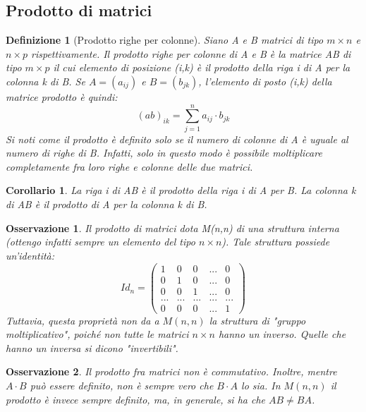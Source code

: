 \documentclass[12pt]{article}
\newenvironment{para}{\begin{adjustwidth}{13mm}{}}{\end{adjustwidth}}
\newtheorem{Definizione}{Definizione}[subsection]
\newtheorem{Corollario}{Corollario}[subsection]
\newtheorem{Osservazione}{Osservazione}[subsection]
\begin{document}
\begin{para}
\subsection{Prodotto di matrici}
\begin{Definizione}[Prodotto righe per colonne]
Siano A e B matrici di tipo $m \times n$ e $n \times p$ rispettivamente. Il prodotto righe per colonne di A e B è la matrice AB di tipo $m \times p$ il cui elemento di posizione (i,k) è il prodotto della riga i di A per la colonna k di B. Se $A = (a_{ij})$ e $B =(b_{jk})$, l'elemento di posto (i,k) della matrice prodotto è quindi:
$$(ab)_{ik} = \sum_{j=1}^n{a_{ij} \cdot b_{jk}}$$
Si noti come il prodotto è definito solo se il numero di colonne di A è uguale al numero di righe di B. Infatti, solo in questo modo è possibile moltiplicare completamente fra loro righe e colonne delle due matrici.
\end{Definizione}

\begin{Corollario}
La riga i di AB è il prodotto della riga i di A per B. La colonna k di AB è il prodotto di A per la colonna k di B.
\end{Corollario}
\newpage
\begin{Osservazione}
    Il prodotto di matrici dota M(n,n) di una struttura interna (ottengo infatti sempre un elemento del tipo $n \times n$). Tale struttura possiede un'identità:
    $$Id_n = \begin{pmatrix}
    1 & 0 & 0 & ... & 0 \\
    0 & 1 & 0 & ... & 0 \\
    0 & 0 & 1 & ... & 0 \\
    ... & ... & ... & ... & ... \\
    0 & 0 & 0 & ... & 1
\end{pmatrix}$$
Tuttavia, questa proprietà non da a $M(n, n)$ la struttura di "gruppo moltiplicativo", poiché non tutte le matrici $n \times n$ hanno un inverso. Quelle che hanno un inversa si dicono "invertibili".
\end{Osservazione}

\begin{Osservazione}
    Il prodotto fra matrici non è commutativo. Inoltre, mentre $A \cdot B$ può essere definito, non è sempre vero che $B \cdot A$ lo sia. In $M(n, n)$ il prodotto è invece sempre definito, ma, in generale, si ha che $AB \neq BA$.
\end{Osservazione}


\end{para}
\end{document}
